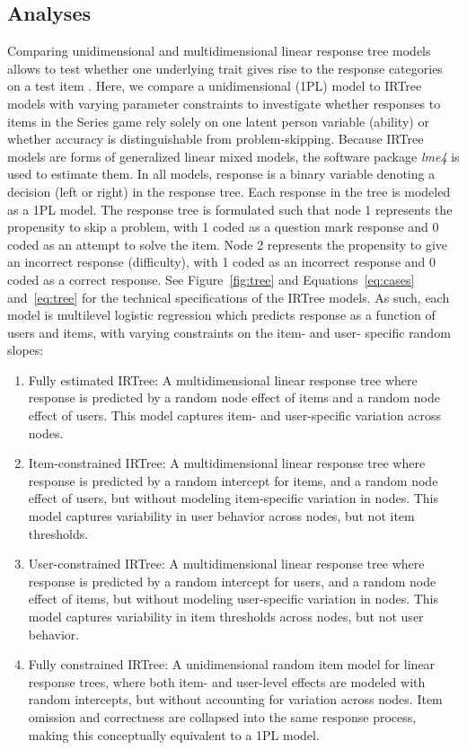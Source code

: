 \documentclass[12pt]{article}
\begin{document}
\subsection{Analyses}
\label{section:analyses}
Comparing unidimensional and multidimensional linear response tree models allows to test whether one underlying trait gives rise to the response categories on a test item \parencite{de2012irtrees}. Here, we compare a unidimensional (1PL) model to IRTree models with varying parameter constraints to investigate whether responses to items in the Series game rely solely on one latent person variable (ability) or whether accuracy is distinguishable from problem-skipping. Because IRTree models are forms of generalized linear mixed models, the software package \textit{lme4} \parencite{bates2015package} is used to estimate them. In all models, response is a binary variable denoting a decision (left or right) in the response tree. Each response in the tree is modeled as a 1PL model. The response tree is formulated such that node 1 represents the propensity to skip a problem, with 1 coded as a question mark response and 0 coded as an attempt to solve the item. Node 2 represents the propensity to give an incorrect response (difficulty), with 1 coded as an incorrect response and 0 coded as a correct response. See Figure~\ref{fig:tree} and Equations~\ref{eq:cases} and~\ref{eq:tree} for the technical specifications of the IRTree models. As such, each model is multilevel logistic regression which predicts response as a function of users and items, with varying constraints on the item- and user- specific random slopes: 

\begin{enumerate}
    \item Fully estimated IRTree: A multidimensional linear response tree where response is predicted by a random node effect of items and a random node effect of users. This model captures item- and user-specific variation across nodes. 
    \item Item-constrained IRTree: A multidimensional linear response tree where response is predicted by a random intercept for items, and a random node effect of users, but without modeling item-specific variation in nodes. This model captures variability in user behavior across nodes, but not item thresholds. 
    \item User-constrained IRTree: A multidimensional linear response tree where response is predicted by a random intercept for users, and a random node effect of items, but without modeling user-specific variation in nodes. This model captures variability in item thresholds across nodes, but not user behavior. 
    \item Fully constrained IRTree: A unidimensional random item model for linear response trees, where both item- and user-level effects are modeled with random intercepts, but without accounting for variation across nodes. Item omission and correctness are collapsed into the same response process, making this conceptually equivalent to a 1PL model. 
\end{enumerate}
\end{document}
